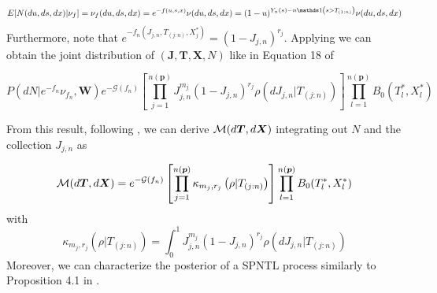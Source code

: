 \begin{equation*}
E[N(du, ds, dx)|\nu_f] = \nu_f(du, ds,dx) = e^{-f(u,s,x)}\nu(du,ds,dx) = (1 - u) ^ {Y_n(s) - n\indicator\left(s > T_{(1:n)}\right)} \nu(du,ds,dx)
\end{equation*}
Furthermore, note that $e^{-f_n(J_{j,n},T_{(j:n)},X_j^*)} = (1 - J_{j,n}) ^ {r_j}$. Applying  we can obtain the joint distribution of $(\boldsymbol{J}, \boldsymbol{T}, \boldsymbol{X}, N)$ like in Equation 18 of \cite{james2006poisson}

\begin{equation}
P(dN|e^{-f_n}\nu_{f_n}, \boldsymbol{W})e^{-\mathcal{G}(f_n)}\left[\prod_{j=1}^{n(\boldsymbol{p})} J_{j,n}^{m_j}(1- J_{j,n})^{r_j} \rho(dJ_{j,n}|T_{(j:n)})\right]\prod_{l=1}^{n(\boldsymbol{p})}B_0(T_l^*, X_l^*)
\end{equation}

From this result, following \cite{james2006poisson}, we can derive $\mathcal{M}(d\boldsymbol{T}, d\boldsymbol{X})$ integrating out $N$ and the collection $J_{j,n}$ as

\begin{equation*}
\mathcal{M}(d\boldsymbol{T}, d\boldsymbol{X}) = e^{-\mathcal{G}(f_n)}\left[\prod_{j=1}^{n(\boldsymbol{p})} \kappa_{m_j, r_j}\left(\rho| T_{(j:n)}\right)\right]\prod_{l=1}^{n(\boldsymbol{p})}B_0(T_l^*, X_l^*)
\end{equation*}
with 
\begin{equation*}
\kappa_{m_j, r_j}\left(\rho |T_{(j:n)}\right)=\int_0^1 J_{j,n}^{m_j}\left(1- J_{j,n}\right)^{r_j} \rho\left(dJ_{j,n}|T_{(j:n)}\right)
\end{equation*}
Moreover, we can characterize the posterior of a SPNTL process similarly to Proposition 4.1 in \cite{james2006poisson}.

